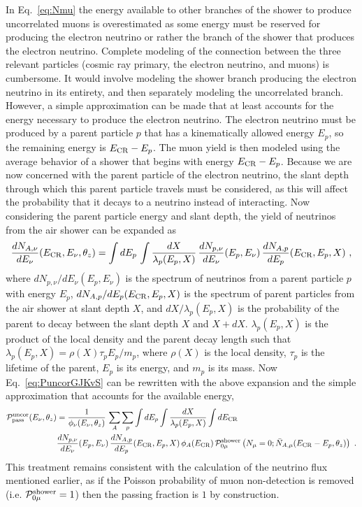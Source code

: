 In Eq.~\ref{eq:Nmu} the energy available to other branches of the shower to produce uncorrelated muons is overestimated as some energy must be reserved for producing the electron neutrino or rather the branch of the shower that produces the electron neutrino.
Complete modeling of the connection between the three relevant particles (cosmic ray primary, the electron neutrino, and muons) is cumbersome.
It would involve modeling the shower branch producing the electron neutrino in its entirety, and then separately modeling the uncorrelated branch.
However, a simple approximation can be made that at least accounts for the energy necessary to produce the electron neutrino.
The electron neutrino must be produced by a parent particle $p$ that has a kinematically allowed energy $E_p$, so the remaining energy is $E_{\rm CR}-E_p$.
The muon yield is then modeled using the average behavior of a shower that begins with energy $E_{\rm CR}-E_p$.
Because we are now concerned with the parent particle of the electron neutrino, the slant depth through which this parent particle travels must be considered, as this will affect the probability that it decays to a neutrino instead of interacting.
Now considering the parent particle energy and slant depth, the yield of neutrinos from the air shower can be expanded as
\begin{equation}
\label{eq:Anuyield}
\frac{dN_{A, \nu}}{dE_\nu}(E_{\rm CR}, E_\nu, \theta_z) = \int dE_p \, \int \frac{dX}{\lambda_p(E_p, X)} \, \frac{dN_{p, \nu}}{dE_\nu}(E_p, E_\nu) \, \frac{dN_{A, p}}{dE_p}(E_{\rm CR}, E_p, X) ~,
\end{equation}
where $dN_{p, \nu}/dE_\nu(E_p,E_\nu)$ is the spectrum of neutrinos from a parent particle $p$ with energy $E_p$, $dN_{A, p}/dE_p(E_{\rm CR},E_p,X)$ is the spectrum of parent particles from the air shower at slant depth $X$, and $dX/{\lambda_p(E_p, X)}$ is the probability of the parent to decay between the slant depth $X$ and $X+dX$.
$\lambda_p(E_p, X)$ is the product of the local density and the parent decay length such that $\lambda_p(E_p, X)=\rho(X) \tau_p E_p/m_p$, where $\rho(X)$ is the local density, $\tau_p$ is the lifetime of the parent, $E_p$ is its energy, and $m_p$ is its mass.
Now Eq.~\ref{eq:PuncorGJKvS} can be rewritten with the above expansion and the simple approximation that accounts for the available energy,
\begin{align}
\label{eq:PuncorGUE}
{\mathcal P}_{\rm pass}^{\rm uncor} (E_\nu, \theta_z) & = \frac{1}{\phi_\nu(E_\nu, \theta_z)} \, \sum_A \sum_{p} \int dE_p \int \frac{dX}{\lambda_p(E_p, X)} \int dE_{\rm CR} \nonumber \\
& \frac{dN_{p, \nu}}{dE_\nu}(E_p, E_\nu) \, \frac{dN_{A, p}}{dE_p}(E_{\rm CR}, E_p, X) \, \phi_A(E_{\rm CR}) \, {\mathcal P}_{0\mu}^{\rm shower} \left(N_\mu = 0  ; \bar N_{A, \mu}(E_{\rm CR} - E_p, \theta_z)\right) ~.
\end{align}
This treatment remains consistent with the calculation of the neutrino flux mentioned earlier, as if the Poisson probability of muon non-detection is removed (i.e. ${\mathcal P}_{0\mu}^{\rm shower}=1$) then the passing fraction is $1$ by construction.

